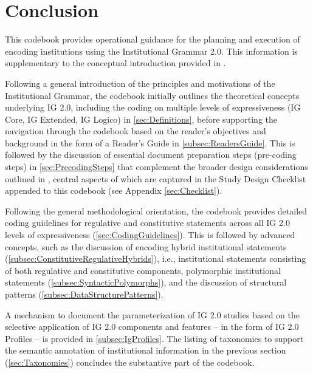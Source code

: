 \clearpairofpagestyles
\chead{\headmark}
\ifoot{\ifootertext}
\ofoot{\ofootertext}
\cfoot{\thepage}

\section{Conclusion}
\label{sec:Conclusion}

This codebook provides operational guidance for the planning and execution of encoding institutions using the Institutional Grammar 2.0. This information is supplementary to the conceptual introduction provided in \citet{Frantz2021,Frantz2022InstitutionalGrammar}. 

Following a general introduction of the principles and motivations of the Institutional Grammar, the codebook initially outlines the theoretical concepts underlying IG 2.0, including the coding on multiple levels of expressiveness (IG Core, IG Extended, IG Logico) in \cref{sec:Definitions}, before supporting the navigation through the codebook based on the reader's objectives and background in the form of a Reader's Guide in \cref{subsec:ReadersGuide}. This is followed by the discussion of essential document preparation steps (pre-coding steps) in \cref{sec:PrecodingSteps} that complement the broader design considerations outlined in \citet{Frantz2022InstitutionalGrammar}, central aspects of which are captured in the Study Design Checklist appended to this codebook (see Appendix \ref{sec:Checklist}).

Following the general methodological orientation, the codebook provides detailed coding guidelines for regulative and constitutive statements across all IG 2.0 levels of expressiveness (\cref{sec:CodingGuidelines}). This is followed by advanced concepts, such as the discussion of encoding hybrid institutional statements (\cref{subsec:ConstitutiveRegulativeHybrids}), i.e., institutional statements consisting of both regulative and constitutive components, polymorphic institutional statements (\cref{subsec:SyntacticPolymorphs}), and the discussion of structural patterns (\cref{subsec:DataStructurePatterns}). 

A mechanism to document the parameterization of IG 2.0 studies based on the selective application of IG 2.0 components and features -- in the form of IG 2.0 Profiles -- is provided in \cref{subsec:IgProfiles}. The listing of taxonomies to support the semantic annotation of institutional information in the previous section (\cref{sec:Taxonomies}) concludes the substantive part of the codebook.

